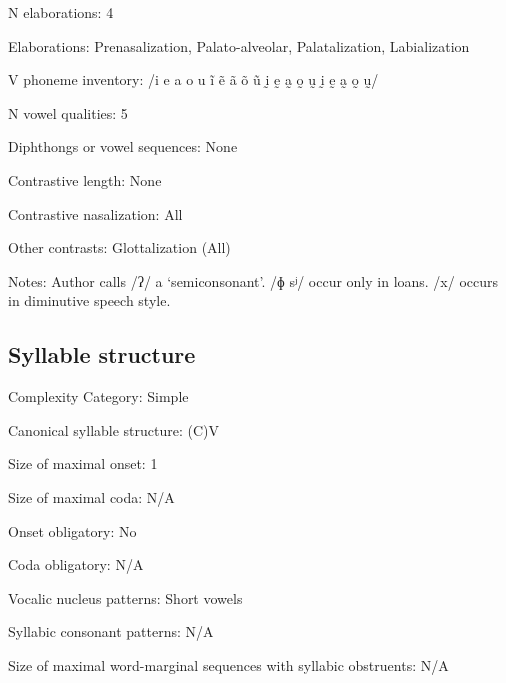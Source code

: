 {\begin{appendixdesc}
\item[N elaborations:] 4

\item[Elaborations:] Prenasalization, Palato-alveolar, Palatalization, Labialization

\item[V phoneme inventory:] /i e a o u ĩ ẽ ã õ ũ ḭ ḛ a̰ o̰ ṵ ḭ ḛ a̰ o̰ ṵ/

\item[N vowel qualities:] 5

\item[Diphthongs or vowel sequences:] None

\item[Contrastive length:] None

\item[Contrastive nasalization:] All

\item[Other contrasts:] Glottalization (All)

\item[Notes:] Author calls /ʔ/ a ‘semiconsonant’. /ɸ sʲ/ occur only in  loans. /x/ occurs in diminutive speech style.
\end{appendixdesc}
\subsection*{Syllable structure}
\begin{appendixdesc}

\item[Complexity Category:] Simple

\item[Canonical syllable structure:] (C)V \citep[14]{Bradley1970}

\item[Size of maximal onset:] 1

\item[Size of maximal coda:] N/A

\item[Onset obligatory:] No

\item[Coda obligatory:] N/A

\item[Vocalic nucleus patterns:] Short vowels

\item[Syllabic consonant patterns:] N/A

\item[Size of maximal word-marginal sequences with syllabic obstruents:] N/A


\end{appendixdesc}}
